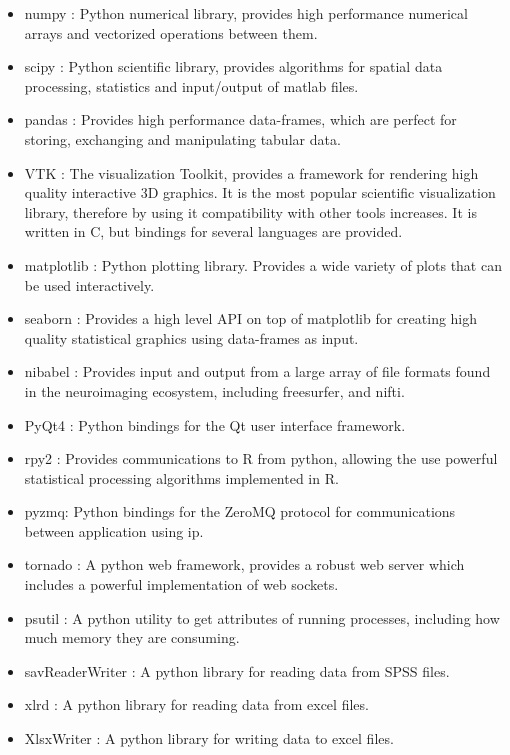 \begin{itemize}
\item numpy \autocite{van_der_walt_numpy_2011}: Python numerical library, provides high performance numerical arrays and vectorized operations between them.
\item scipy \autocite{jones_scipy:_2001}: Python scientific library, provides algorithms for spatial data processing, statistics and input/output of matlab files.
\item pandas \autocite{mckinney_data_2010}: Provides high performance data-frames, which are perfect for storing, exchanging and manipulating tabular data.
\item VTK \autocite{schroeder_vtk_1998} : The visualization Toolkit, provides a framework for rendering high quality interactive 3D graphics. It is the most popular scientific visualization library, therefore by using it  compatibility with other tools increases. It is written in C, but bindings for several languages are provided.
\item matplotlib \autocite{hunter_matplotlib:_2007} : Python plotting library. Provides a wide variety of plots that can be used interactively.
\item seaborn \autocite{michael_waskom_seaborn:_2015} : Provides a high level API on top of matplotlib for creating high quality statistical graphics using data-frames as input.
\item nibabel \autocite{brett_neuroimaging_2006} : Provides input and output from a large array of file formats found in the neuroimaging ecosystem, including freesurfer, and nifti.
\item PyQt4 : Python bindings for the Qt user interface framework.
\item rpy2  \autocite{gautier_rpy2:_2008} : Provides communications to R \autocite{team_r:_2012} from python, allowing the use powerful statistical processing algorithms implemented in R.
\item pyzmq: Python bindings for the ZeroMQ \autocite{hintjens_zeromq:_2013} protocol for communications between application using ip.
\item tornado : A python web framework, provides a robust web server which includes a powerful implementation of web sockets.
\item psutil : A python utility to get attributes of running processes, including how much memory they are consuming.
\item savReaderWriter : A python library for reading data from SPSS files.
\item xlrd : A python library for reading data from excel files.
\item XlsxWriter : A python library for writing data to excel files.
\end{itemize}

